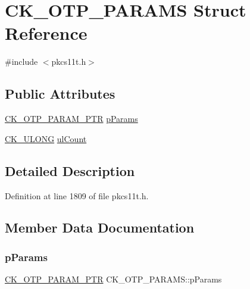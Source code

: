 \hypertarget{struct_c_k___o_t_p___p_a_r_a_m_s}{}\section{C\+K\+\_\+\+O\+T\+P\+\_\+\+P\+A\+R\+A\+MS Struct Reference}
\label{struct_c_k___o_t_p___p_a_r_a_m_s}


{\ttfamily \#include $<$pkcs11t.\+h$>$}

\subsection*{Public Attributes}
\begin{DoxyCompactItemize}
\item 
\hyperlink{pkcs11t_8h_a520ae5ec458e07a78dd1f869974e6b98}{C\+K\+\_\+\+O\+T\+P\+\_\+\+P\+A\+R\+A\+M\+\_\+\+P\+TR} \hyperlink{struct_c_k___o_t_p___p_a_r_a_m_s_a0c1c31bc572747df887a0f2fd470829b}{p\+Params}
\item 
\hyperlink{pkcs11t_8h_a35181858a3b7a0a81f49d180d8f446ef}{C\+K\+\_\+\+U\+L\+O\+NG} \hyperlink{struct_c_k___o_t_p___p_a_r_a_m_s_add62565e22aa0a71327114091fbaa2d4}{ul\+Count}
\end{DoxyCompactItemize}


\subsection{Detailed Description}


Definition at line 1809 of file pkcs11t.\+h.



\subsection{Member Data Documentation}
\mbox{\label{struct_c_k___o_t_p___p_a_r_a_m_s_a0c1c31bc572747df887a0f2fd470829b}} 
\subsubsection{\texorpdfstring{p\+Params}{pParams}}
{\footnotesize\ttfamily \hyperlink{pkcs11t_8h_a520ae5ec458e07a78dd1f869974e6b98}{C\+K\+\_\+\+O\+T\+P\+\_\+\+P\+A\+R\+A\+M\+\_\+\+P\+TR} C\+K\+\_\+\+O\+T\+P\+\_\+\+P\+A\+R\+A\+M\+S\+::p\+Params}



